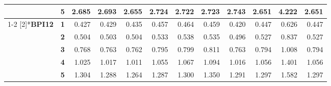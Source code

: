 \begin{table}[htbp]
{\begin{tabular}{|cl|rrrrrrrrrr|}
          & \textbf{5} & \cellcolor[rgb]{ .8,  .8,  .8}2.685 & \cellcolor[rgb]{ .796,  .796,  .796}2.693 & \cellcolor[rgb]{ .8,  .8,  .8}2.655 & \cellcolor[rgb]{ .796,  .796,  .796}2.724 & \cellcolor[rgb]{ .796,  .796,  .796}2.722 & \cellcolor[rgb]{ .796,  .796,  .796}2.723 & \cellcolor[rgb]{ .792,  .792,  .792}2.743 & \cellcolor[rgb]{ .8,  .8,  .8}2.651 & \cellcolor[rgb]{ .651,  .651,  .651}4.222 & \cellcolor[rgb]{ .8,  .8,  .8}2.651 \\
\cmidrule{1-2}    \multirow{5}[2]{*}{\textbf{BPI12}} & \textbf{1} & \cellcolor[rgb]{ .851,  .851,  .851}0.427 & \cellcolor[rgb]{ .851,  .851,  .851}0.429 & \cellcolor[rgb]{ .851,  .851,  .851}0.435 & \cellcolor[rgb]{ .847,  .847,  .847}0.457 & \cellcolor[rgb]{ .847,  .847,  .847}0.464 & \cellcolor[rgb]{ .847,  .847,  .847}0.459 & \cellcolor[rgb]{ .851,  .851,  .851}0.420 & \cellcolor[rgb]{ .847,  .847,  .847}0.447 & \cellcolor[rgb]{ .816,  .816,  .816}0.626 & \cellcolor[rgb]{ .847,  .847,  .847}0.447 \\
          & \textbf{2} & \cellcolor[rgb]{ .839,  .839,  .839}0.504 & \cellcolor[rgb]{ .839,  .839,  .839}0.503 & \cellcolor[rgb]{ .839,  .839,  .839}0.504 & \cellcolor[rgb]{ .835,  .835,  .835}0.533 & \cellcolor[rgb]{ .831,  .831,  .831}0.538 & \cellcolor[rgb]{ .831,  .831,  .831}0.535 & \cellcolor[rgb]{ .839,  .839,  .839}0.496 & \cellcolor[rgb]{ .835,  .835,  .835}0.527 & \cellcolor[rgb]{ .78,  .78,  .78}0.837 & \cellcolor[rgb]{ .835,  .835,  .835}0.527 \\
          & \textbf{3} & \cellcolor[rgb]{ .792,  .792,  .792}0.768 & \cellcolor[rgb]{ .792,  .792,  .792}0.763 & \cellcolor[rgb]{ .792,  .792,  .792}0.762 & \cellcolor[rgb]{ .788,  .788,  .788}0.795 & \cellcolor[rgb]{ .788,  .788,  .788}0.799 & \cellcolor[rgb]{ .784,  .784,  .784}0.811 & \cellcolor[rgb]{ .792,  .792,  .792}0.763 & \cellcolor[rgb]{ .788,  .788,  .788}0.794 & \cellcolor[rgb]{ .753,  .753,  .753}1.008 & \cellcolor[rgb]{ .788,  .788,  .788}0.794 \\
          & \textbf{4} & \cellcolor[rgb]{ .749,  .749,  .749}1.025 & \cellcolor[rgb]{ .749,  .749,  .749}1.017 & \cellcolor[rgb]{ .753,  .753,  .753}1.011 & \cellcolor[rgb]{ .745,  .745,  .745}1.055 & \cellcolor[rgb]{ .741,  .741,  .741}1.067 & \cellcolor[rgb]{ .737,  .737,  .737}1.094 & \cellcolor[rgb]{ .749,  .749,  .749}1.016 & \cellcolor[rgb]{ .745,  .745,  .745}1.056 & \cellcolor[rgb]{ .682,  .682,  .682}1.401 & \cellcolor[rgb]{ .745,  .745,  .745}1.056 \\
          & \textbf{5} & \cellcolor[rgb]{ .702,  .702,  .702}1.304 & \cellcolor[rgb]{ .702,  .702,  .702}1.288 & \cellcolor[rgb]{ .706,  .706,  .706}1.264 & \cellcolor[rgb]{ .702,  .702,  .702}1.287 & \cellcolor[rgb]{ .702,  .702,  .702}1.300 & \cellcolor[rgb]{ .694,  .694,  .694}1.350 & \cellcolor[rgb]{ .702,  .702,  .702}1.291 & \cellcolor[rgb]{ .702,  .702,  .702}1.297 & \cellcolor[rgb]{ .651,  .651,  .651}1.582 & \cellcolor[rgb]{ .702,  .702,  .702}1.297 \\

\end{tabular}}
\end{table}
